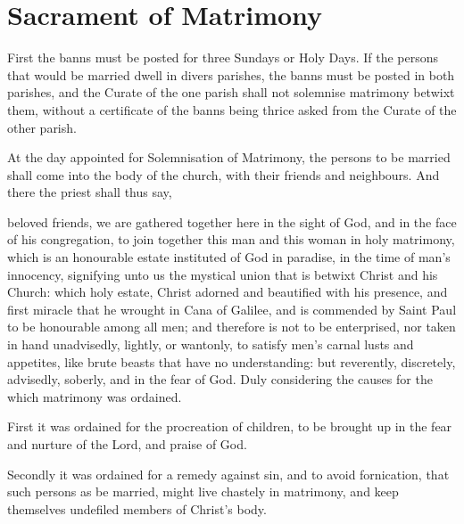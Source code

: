\section{Sacrament of Matrimony}
\fancyhead[RE,LO]{}
\begin{secrubric}
First the banns must be posted for three Sundays or Holy Days. If the persons that would be married dwell in divers parishes, the banns must be posted in both parishes, and the Curate of the one parish shall not solemnise matrimony betwixt them, without a certificate of the banns being thrice asked from the Curate of the other parish.\par
At the day appointed for Solemnisation of Matrimony, the persons to be married shall come into the body of the church, with their friends and neighbours. And there the priest shall thus say,
\end{secrubric}
 beloved friends, we are gathered together here in the sight of God, and in the face of his congregation, to join together this man and this woman in holy matrimony, which is an honourable estate instituted of God in paradise, in the time of man's innocency, signifying unto us the mystical union that is betwixt Christ and his Church: which holy estate, Christ adorned and beautified with his presence, and first miracle that he wrought in Cana of Galilee, and is commended by Saint Paul to be honourable among all men; and therefore is not to be enterprised, nor taken in hand unadvisedly, lightly, or wantonly, to satisfy men's carnal lusts and appetites, like brute beasts that have no understanding: but reverently, discretely, advisedly, soberly, and in the fear of God. Duly considering the causes for the which matrimony was ordained.
\par
{}
First it was ordained for the procreation of children, to be brought up in the fear and nurture of the Lord, and praise of God.\par
Secondly it was ordained for a remedy against sin, and to avoid fornication, that such persons as be married, might live chastely in matrimony, and keep themselves undefiled members of Christ's body.\par
